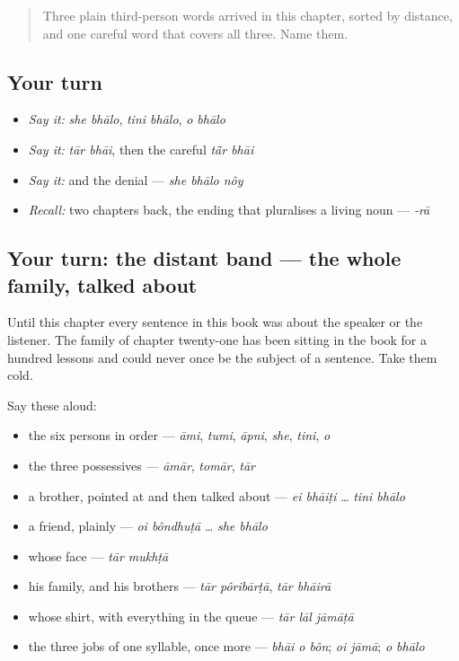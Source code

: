\label{lesson:BN-R23-somebody-else}



\begin{quote}
Three plain third-person words arrived in this chapter, sorted by distance, and one careful word that covers all three. Name them.
\end{quote}

\subsection*{Your turn}
\begin{itemize}
\raggedright
  \item \emph{Say it:} \emph{she bhālo}, \emph{tini bhālo}, \emph{o bhālo}
  \item \emph{Say it:} \emph{tār bhāi}, then the careful \emph{tā̃r bhāi}
  \item \emph{Say it:} and the denial — \emph{she bhālo nôy}
  \item \emph{Recall:} two chapters back, the ending that pluralises a living noun — \emph{-rā}
\end{itemize}

\subsection*{Your turn: the distant band — the whole family, talked about}
Until this chapter every sentence in this book was about the speaker or the listener. The family of chapter twenty-one has been sitting in the book for a hundred lessons and could never once be the subject of a sentence. Take them cold.

Say these aloud:

\begin{itemize}
\raggedright
  \item the six persons in order — \emph{āmi}, \emph{tumi}, \emph{āpni}, \emph{she}, \emph{tini}, \emph{o}
  \item the three possessives — \emph{āmār}, \emph{tomār}, \emph{tār}
  \item a brother, pointed at and then talked about — \emph{ei bhāiṭi} … \emph{tini bhālo}
  \item a friend, plainly — \emph{oi bôndhuṭā} … \emph{she bhālo}
  \item whose face — \emph{tār mukhṭā}
  \item his family, and his brothers — \emph{tār pôribārṭā}, \emph{tār bhāirā}
  \item whose shirt, with everything in the queue — \emph{tār lāl jāmāṭā}
  \item the three jobs of one syllable, once more — \emph{bhāi o bôn}; \emph{oi jāmā}; \emph{o bhālo}
\end{itemize}

